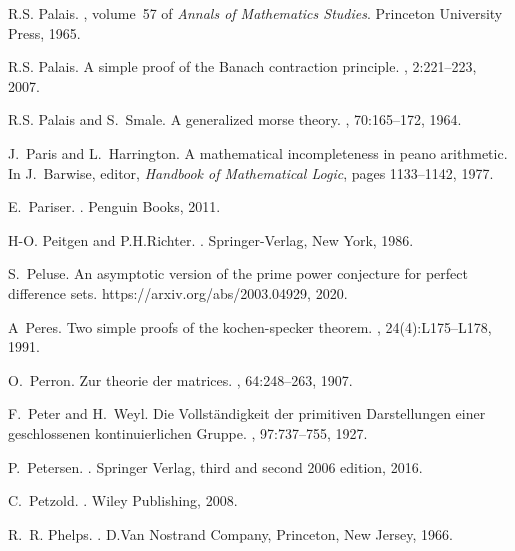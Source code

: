 \documentclass[12pt]{amsart}
\begin{document}
\begin{thebibliography}{100}
R.S. Palais.
, volume~57 of {\em
  Annals of Mathematics Studies}.
\newblock Princeton University Press, 1965.

R.S. Palais.
\newblock A simple proof of the {B}anach contraction principle.
, 2:221--223, 2007.

R.S. Palais and S.~Smale.
\newblock A generalized morse theory.
, 70:165--172, 1964.

J.~Paris and L.~Harrington.
\newblock A mathematical incompleteness in peano arithmetic.
\newblock In J.~Barwise, editor, {\em Handbook of Mathematical Logic}, pages
  1133--1142, 1977.

E.~Pariser.
.
\newblock Penguin Books, 2011.

H-O. Peitgen and P.H.Richter.
.
\newblock Springer-Verlag, New York, 1986.

S.~Peluse.
\newblock An asymptotic version of the prime power conjecture for perfect
  difference sets.
\newblock https://arxiv.org/abs/2003.04929, 2020.

A~Peres.
\newblock Two simple proofs of the kochen-specker theorem.
,
  24(4):L175--L178, 1991.

O.~Perron.
\newblock Zur theorie der matrices.
, 64:248--263, 1907.

F.~Peter and H.~Weyl.
\newblock Die {V}ollst{\"a}ndigkeit der primitiven {D}arstellungen einer
  geschlossenen kontinuierlichen {G}ruppe.
, 97:737--755, 1927.

P.~Petersen.
.
\newblock Springer Verlag, third and second 2006 edition, 2016.

C.~Petzold.
.
\newblock Wiley Publishing, 2008.

R.~R. Phelps.
.
\newblock D.Van Nostrand Company, Princeton, New Jersey, 1966.


\end{thebibliography}
\end{document}
